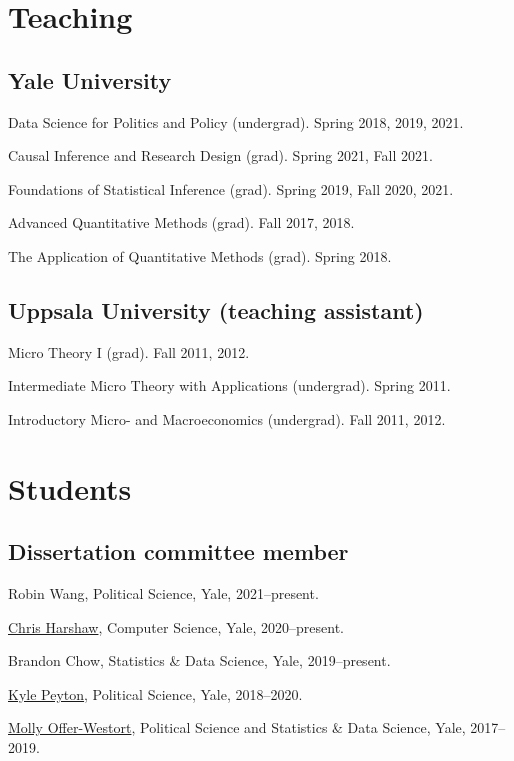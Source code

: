 \documentclass[10pt,letterpaper]{article}
\newenvironment{infolist}{
	\begin{list}{}{
		\setlength{\parskip}{0pt}
		\setlength{\itemsep}{4pt}
		\setlength{\parsep}{0.3em}
		\setlength{\leftmargin}{0em}
		\setlength{\labelwidth}{0em}
		}
	}{
\end{list}
}
\newcommand{\infoitem}[1]{\item {#1}}
\begin{document}
	\section*{Teaching}

	\subsection*{Yale University}

	\begin{infolist}
		\infoitem{Data Science for Politics and Policy (undergrad). Spring 2018, 2019, 2021.}
		\infoitem{Causal Inference and Research Design (grad). Spring 2021, Fall 2021.}
		\infoitem{Foundations of Statistical Inference (grad). Spring 2019, Fall 2020, 2021.}
		\infoitem{Advanced Quantitative Methods (grad). Fall 2017, 2018.}
		\infoitem{The Application of Quantitative Methods (grad). Spring 2018.}
	\end{infolist}

	\subsection*{Uppsala University (teaching assistant)}

	\begin{infolist}
		\infoitem{Micro Theory I (grad). Fall 2011, 2012.}
		\infoitem{Intermediate Micro Theory with Applications (undergrad). Spring 2011.}
		\infoitem{Introductory Micro- and Macroeconomics (undergrad). Fall 2011, 2012.}
	\end{infolist}


	\section*{Students}

	\subsection*{Dissertation committee member}

	\begin{infolist}
		\infoitem{Robin Wang, Political Science, Yale, 2021--present.}
		\infoitem{\href{http://www.chrisharshaw.com/}{Chris Harshaw}, Computer Science, Yale, 2020--present.}
		\infoitem{Brandon Chow, Statistics \& Data Science, Yale, 2019--present.}
		\infoitem{\href{https://kylepeyton.github.io}{Kyle Peyton}, Political Science, Yale, 2018--2020.}
		\infoitem{\href{https://mollyow.github.io}{Molly Offer-Westort}, Political Science and Statistics \& Data Science, Yale, 2017--2019.}
	\end{infolist}
\end{document}
